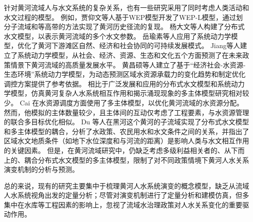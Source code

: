 针对黄河流域人与水文系统的复杂关系，也有一些研究采用了同时考虑人类活动和水文过程的模型。
例如，贾仰文等人基于WEP模型开发了WEP-L模型，通过划分子流域和等高带的方法实现了黄河历史径流的复现\cite{jiayangwen2005}。
杨大文等人构建了分布式水文模型，以表示黄河流域的多个水文参数\cite{yangdawen2004}。
岳瑜素等人应用了系统动力学模型，优化了黄河下游滩区自然、经济和社会协同的可持续发展模式\cite{yueyusu2020}。
Jiang等人建立了系统动力学模型，从社会、经济、资源、生态和文化五个方面预测了在未来政策情景下黄河流域的高质量发展水平\cite{jiang2021b}。
黄昌硕等人建立了基于“经济社会-水资源-生态环境”系统动力学模型，为动态预测区域水资源承载力的变化趋势和制定优化调控方案提供了参考依据\cite{huangchangshuo2021}。
相比于广泛发展和应用的分布式水文模型和系统动力学模型，仿真黄河复杂人水系统相互作用和揭示涌现现象的多主体模型研究相对较少。
Cai 在水资源调度方面使用了多主体模型，以优化黄河流域的水资源分配。然而，他模拟的主体数量较少，且主体间的互动仅考虑了工程要素，与水资源管理的联合多目标优化相似\cite{cai2011}。
Du 等人在黑河这个黄河的子流域实现了分布式水文模型和多主体模型的耦合，分析了水政策、农民用水和水文条件之间的关系，并指出了区域水文地质条件（如地下水位深度和与河流的距离）是影响人类与水文相互作用的关键因素\cite{du2020}。
但是，在黄河流域研究中，仍缺乏考虑多级利益相关者的、从下而上的、耦合分布式水文模型的多主体模型，限制了对不同政策情境下黄河人水关系演变机制的分析与预测。

总的来说，现有的研究主要集中于梳理黄河人水系统演变的概念模型，缺乏从流域人水系统视角出发的定量分析；尽管对演变机制进行了定量分析和建模仿真，但多集中在水库等工程因素的影响上，忽视了流域水治理政策对人水关系变化的重要驱动作用。
